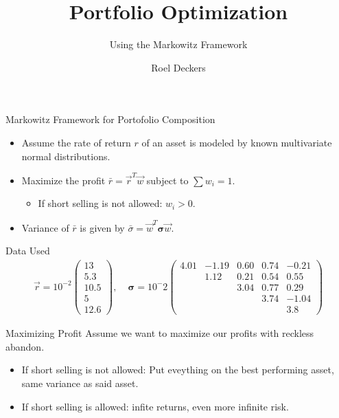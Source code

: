 \documentclass{beamer}
\title{Portfolio Optimization}
\subtitle{Using the Markowitz Framework}
\author{Roel Deckers}
\numberwithin{equation}{section}
\begin{document}
  \begin{frame}
    \frame{\titlepage}
  \end{frame}

\begin{frame}{Markowitz Framework for Portofolio Composition}
  \begin{itemize}
    \item{Assume the rate of return $r$ of an asset is modeled by known multivariate normal distributions.}
    \item{Maximize the profit $\bar r = \vec r^T \vec w$ subject to $\sum w_i = 1$.}
    \begin{itemize}
      \item{If short selling is not allowed: $w_i > 0$.}
    \end{itemize}
    \item{Variance of $\bar r$ is given by $\bar \sigma = \vec w^T\boldsymbol{\sigma}\vec w$.}
  \end{itemize}
\end{frame}

\begin{frame}{Data Used}
  \begin{align*}
    \vec r = 10^{-2}\begin{pmatrix}
    13 \\ 5.3 \\ 10.5 \\ 5 \\ 12.6
  \end{pmatrix},\; &\boldsymbol{\sigma} = 10^-2\begin{pmatrix}
  4.01 & -1.19 & 0.60 & 0.74 & -0.21\\
   & 1.12 & 0.21 & 0.54 & 0.55\\
   &  & 3.04 & 0.77 & 0.29 \\
  & & & 3.74 & -1.04\\
  &&&& 3.8
  \end{pmatrix}
  \end{align*}
\end{frame}

\begin{frame}{Maximizing Profit}
  Assume we want to maximize our profits with reckless abandon.
  \begin{itemize}
    \item{If short selling is not allowed: Put eveything on the best performing asset, same variance as said asset.}
    \item{If short selling is allowed: infite returns, even more infinite risk.}
  \end{itemize}
\end{frame}
\end{document}
